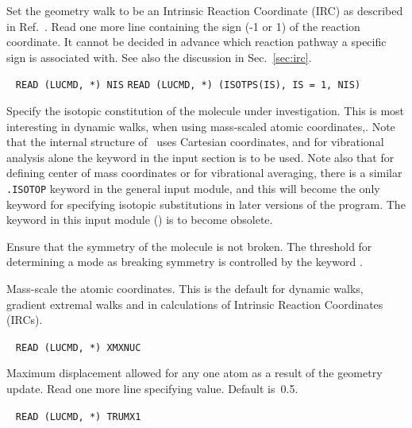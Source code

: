 \begin{description}
Set the geometry walk to be  an
Intrinsic Reaction Coordinate (IRC) as described in
Ref.~\cite{kfacr14,pmjcp88}. Read one
more line containing the sign (-1 or 1) of the reaction coordinate. It
cannot be decided in advance which reaction pathway a specific sign is
associated with. See also the discussion in Sec.~\ref{sec:irc}.

\item[\Key{ISOTOP}]\verb| |\newline
\verb|READ (LUCMD, *) NIS|\newline
\verb|READ (LUCMD, *) (ISOTPS(IS), IS = 1, NIS)|

Specify the isotopic constitution of the
molecule under investigation.
This is most interesting in dynamic walks, 
when using mass-scaled atomic coordinates,. Note that the internal structure of
\aba\ uses Cartesian coordinates, and for vibrational analysis alone
the keyword  in the  input section is to be
used. Note also that for defining center of mass
coordinates or for vibrational averaging, there is a similar \verb|.ISOTOP| keyword in the general
input module, and this will become the only keyword for specifying
isotopic substitutions in later versions of the program. The
 keyword in this input module () is to become
obsolete.

\item[\Key{KEEPSY}] Ensure that the symmetry of the molecule is not
broken. The threshold for determining a mode as breaking symmetry is
controlled by the keyword .

\item[\Key{MASSES}] Mass-scale the atomic coordinates.  This is the
default for dynamic walks, gradient
extremal walks and in calculations
of Intrinsic Reaction Coordinates (IRCs).

\item[\Key{MAXNUC}]\verb| |\newline
\verb|READ (LUCMD, *) XMXNUC|

Maximum displacement allowed for any one
atom as a result of the
geometry update.  Read one more line specifying value.  Default
is~0.5.

\item[\Key{MAXTRU}]\verb| |\newline
\verb|READ (LUCMD, *) TRUMX1|


\end{description}
